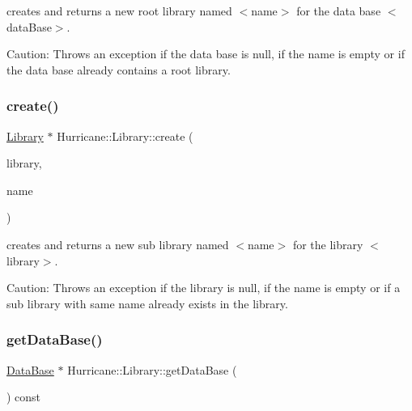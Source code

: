creates and returns a new root library named {\ttfamily $<$name$>$} for the data base {\ttfamily $<$data\+Base$>$}.

\begin{DoxyParagraph}{Caution\+: Throws an exception if the data base is null, if the name is }
empty or if the data base already contains a root library. 
\end{DoxyParagraph}
\mbox{\label{classHurricane_1_1Library_a36bc1af0e48307180be81a81d462650e}} 
\subsubsection{\texorpdfstring{create()}{create()}\hspace{0.1cm}{\footnotesize\ttfamily [2/2]}}
{\footnotesize\ttfamily \mbox{\hyperlink{classHurricane_1_1Library}{Library}} $\ast$ Hurricane\+::\+Library\+::create (\begin{DoxyParamCaption}\item[{\mbox{\hyperlink{classHurricane_1_1Library}{Library}} $\ast$}]{library,  }\item[{const \mbox{\hyperlink{classHurricane_1_1Name}{Name}} \&}]{name }\end{DoxyParamCaption})\hspace{0.3cm}{\ttfamily [static]}}

creates and returns a new sub library named {\ttfamily $<$name$>$} for the library {\ttfamily $<$library$>$}.

\begin{DoxyParagraph}{Caution\+: Throws an exception if the library is null, if the name is }
empty or if a sub library with same name already exists in the library. 
\end{DoxyParagraph}
\mbox{\label{classHurricane_1_1Library_a657cbf1ac426ef6def0b5b51f80ed248}} 
\subsubsection{\texorpdfstring{get\+Data\+Base()}{getDataBase()}}
{\footnotesize\ttfamily \mbox{\hyperlink{classHurricane_1_1DataBase}{Data\+Base}} $\ast$ Hurricane\+::\+Library\+::get\+Data\+Base (\begin{DoxyParamCaption}{ }\end{DoxyParamCaption}) const\hspace{0.3cm}{\ttfamily [inline]}}

